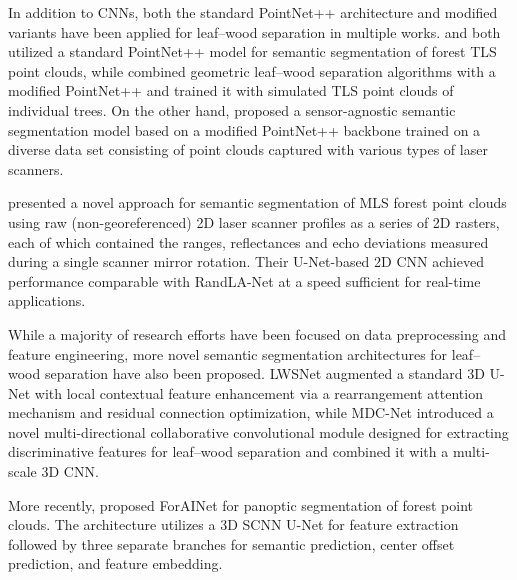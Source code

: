 In addition to CNNs, both the standard PointNet++ architecture and modified variants have been applied for leaf--wood separation in multiple works. \cite{kim2023automated} and \cite{wielgosz2023point2tree} both utilized a standard PointNet++ model for semantic segmentation of forest TLS point clouds, while \citet{morel2020segmentation} combined geometric leaf--wood separation algorithms with a modified PointNet++ and trained it with simulated TLS point clouds of individual trees. On the other hand, \cite{krisanski2021sensor} proposed a sensor-agnostic semantic segmentation model based on a modified PointNet++ backbone trained on a diverse data set consisting of point clouds captured with various types of laser scanners.

\cite{kaijaluoto2022semantic} presented a novel approach for semantic segmentation of MLS forest point clouds using raw (non-georeferenced) 2D laser scanner profiles as a series of 2D rasters, each of which contained the ranges, reflectances and echo deviations measured during a single scanner mirror rotation. Their U-Net-based 2D CNN achieved performance comparable with RandLA-Net at a speed sufficient for real-time applications.

While a majority of research efforts have been focused on data preprocessing and feature engineering, more novel semantic segmentation architectures for leaf--wood separation have also been proposed. LWSNet \citep{jiang2023lwsnet} augmented a standard 3D U-Net with local contextual feature enhancement via a rearrangement attention mechanism and residual connection optimization, while MDC-Net \citep{dai2023mdcnet} introduced a novel multi-directional collaborative convolutional module designed for extracting discriminative features for leaf--wood separation and combined it with a multi-scale 3D CNN.

More recently, \cite{xiang2024automated} proposed ForAINet for panoptic segmentation of forest point clouds. The architecture utilizes a 3D SCNN U-Net for feature extraction followed by three separate branches for semantic prediction, center offset prediction, and feature embedding.